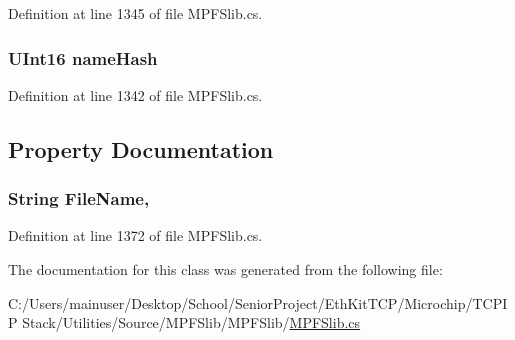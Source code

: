Definition at line 1345 of file M\+P\+F\+Slib.\+cs.

\hypertarget{class_microchip_1_1_m_p_f_s_file_record_aeb0642208aa779de12a59f1cd4e7ee94}{}
\subsubsection[{name\+Hash}]{\setlength{\rightskip}{0pt plus 5cm}U\+Int16 name\+Hash}\label{class_microchip_1_1_m_p_f_s_file_record_aeb0642208aa779de12a59f1cd4e7ee94}


Definition at line 1342 of file M\+P\+F\+Slib.\+cs.



\subsection{Property Documentation}
\hypertarget{class_microchip_1_1_m_p_f_s_file_record_a5066dd8adab56e4ea54fe46b9db3bd9a}{}
\subsubsection[{File\+Name}]{\setlength{\rightskip}{0pt plus 5cm}String File\+Name\hspace{0.3cm}{\ttfamily [get]}, {\ttfamily [set]}}\label{class_microchip_1_1_m_p_f_s_file_record_a5066dd8adab56e4ea54fe46b9db3bd9a}


Definition at line 1372 of file M\+P\+F\+Slib.\+cs.



The documentation for this class was generated from the following file\+:\begin{DoxyCompactItemize}
\item 
C\+:/\+Users/mainuser/\+Desktop/\+School/\+Senior\+Project/\+Eth\+Kit\+T\+C\+P/\+Microchip/\+T\+C\+P\+I\+P Stack/\+Utilities/\+Source/\+M\+P\+F\+Slib/\+M\+P\+F\+Slib/\hyperlink{_m_p_f_slib_8cs}{M\+P\+F\+Slib.\+cs}\end{DoxyCompactItemize}
